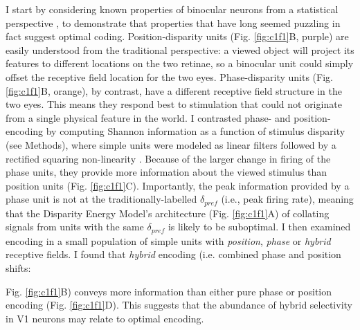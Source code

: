 I start by considering known properties of binocular neurons from a statistical perspective \cite{Shannon1948}, to demonstrate that properties that have long seemed puzzling in fact suggest optimal coding. Position-disparity units (Fig. \ref{fig:c1f1}B, purple) are easily understood from the traditional perspective: a viewed object will project its features to different locations on the two retinae, so a binocular unit could simply offset the receptive field location for the two eyes. Phase-disparity units (Fig. \ref{fig:c1f1}B, orange), by contrast, have a different receptive field structure in the two eyes. This means they respond best to stimulation that could not originate from a single physical feature in the world. I contrasted phase- and position- encoding by computing Shannon information \cite{Shannon1948} as a function of stimulus disparity (see Methods), where simple units were modeled as linear filters followed by a rectified squaring non-linearity \cite{Ohzawa:1990cq}. Because of the larger change in firing of the phase units, they provide more information about the viewed stimulus than position units (Fig. \ref{fig:c1f1}C). Importantly, the peak information provided by a phase unit is not at the traditionally-labelled $\delta_{pref}$ (i.e., peak firing rate), meaning that the Disparity Energy Model's architecture (Fig. \ref{fig:c1f1}A) of collating signals from units with the same $\delta_{pref}$ is likely to be suboptimal. I then examined encoding in a small population of simple units with \emph {position}, \emph {phase} or \emph {hybrid} receptive fields. I found that \emph {hybrid} encoding (i.e. combined phase and position shifts: {Fig. \ref{fig:c1f1}B) conveys more information than either pure phase or position encoding (Fig. \ref{fig:c1f1}D). This suggests that the abundance of hybrid selectivity in V1 neurons \cite{DeAngelis:1991mb, Prince:2002uq, Tsao:2003pi} may relate to optimal encoding. 

}
